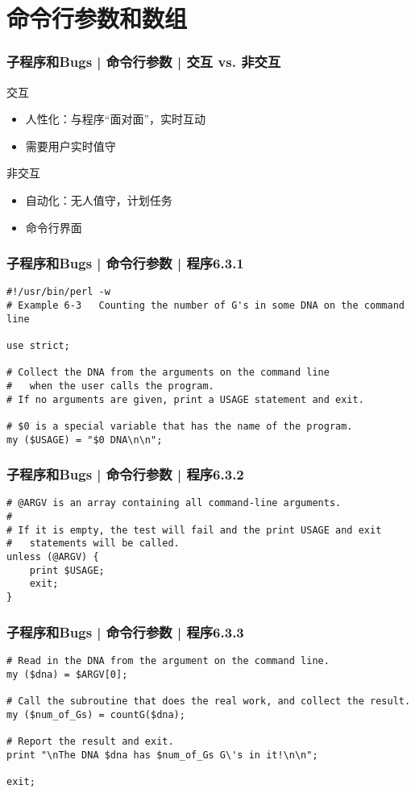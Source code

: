 \section{命令行参数和数组}
\begin{frame}
  \frametitle{子程序和Bugs | 命令行参数 | 交互 vs. 非交互}
  \begin{block}{交互}
    \begin{itemize}
      \item 人性化：与程序“面对面”，实时互动
      \item 需要用户实时值守
    \end{itemize}
  \end{block}
  \pause
  \begin{block}{非交互}
    \begin{itemize}
      \item 自动化：无人值守，计划任务
      \item 命令行界面
    \end{itemize}
  \end{block}
\end{frame}

\begin{frame}[fragile]
  \frametitle{子程序和Bugs | 命令行参数 | 程序6.3.1}
\begin{lstlisting}[firstnumber=1]
#!/usr/bin/perl -w
# Example 6-3   Counting the number of G's in some DNA on the command line

use strict;

# Collect the DNA from the arguments on the command line
#   when the user calls the program.
# If no arguments are given, print a USAGE statement and exit.

# $0 is a special variable that has the name of the program.
my ($USAGE) = "$0 DNA\n\n";
\end{lstlisting}
\end{frame}

\begin{frame}[fragile]
  \frametitle{子程序和Bugs | 命令行参数 | 程序6.3.2}
\begin{lstlisting}[firstnumber=13]
# @ARGV is an array containing all command-line arguments.
#
# If it is empty, the test will fail and the print USAGE and exit
#   statements will be called.
unless (@ARGV) {
    print $USAGE;
    exit;
}
\end{lstlisting}
\end{frame}

\begin{frame}[fragile]
  \frametitle{子程序和Bugs | 命令行参数 | 程序6.3.3}
\begin{lstlisting}[firstnumber=22]
# Read in the DNA from the argument on the command line.
my ($dna) = $ARGV[0];

# Call the subroutine that does the real work, and collect the result.
my ($num_of_Gs) = countG($dna);

# Report the result and exit.
print "\nThe DNA $dna has $num_of_Gs G\'s in it!\n\n";

exit;
\end{lstlisting}
\end{frame}

